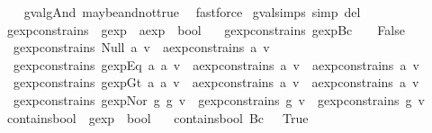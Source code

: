 \begin{isabellebody}
%
\isadelimproof
\ \ %
\endisadelimproof
%
\isatagproof
{}\isamarkupfalse%
\ gval{\isacharunderscore}gAnd\ maybe{\isacharunderscore}and{\isacharunderscore}not{\isacharunderscore}true\ \isamarkupfalse%
\ fastforce%
\endisatagproof
{\isafoldproof}%
%
\isadelimproof
\isanewline
%
\endisadelimproof
\isanewline
{}\isamarkupfalse%
\ gval{\isachardot}simps\ {\isacharbrackleft}simp\ del{\isacharbrackright}\isanewline
\isanewline
{}\isamarkupfalse%
\ gexp{\isacharunderscore}constrains\ {\isacharcolon}{\isacharcolon}\ {\isachardoublequoteopen}gexp\ {\isasymRightarrow}\ aexp\ {\isasymRightarrow}\ bool{\isachardoublequoteclose}\ \isanewline
\ \ {\isachardoublequoteopen}gexp{\isacharunderscore}constrains\ {\isacharparenleft}gexp{\isachardot}Bc\ {\isacharunderscore}{\isacharparenright}\ {\isacharunderscore}\ {\isacharequal}\ False{\isachardoublequoteclose}\ {\isacharbar}\isanewline
\ \ {\isachardoublequoteopen}gexp{\isacharunderscore}constrains\ {\isacharparenleft}Null\ a{\isacharparenright}\ v\ {\isacharequal}\ aexp{\isacharunderscore}constrains\ a\ v{\isachardoublequoteclose}\ {\isacharbar}\isanewline
\ \ {\isachardoublequoteopen}gexp{\isacharunderscore}constrains\ {\isacharparenleft}gexp{\isachardot}Eq\ a{}\ a{}{\isacharparenright}\ v\ {\isacharequal}\ {\isacharparenleft}aexp{\isacharunderscore}constrains\ a{}\ v\ {\isasymor}\ aexp{\isacharunderscore}constrains\ a{}\ v{\isacharparenright}{\isachardoublequoteclose}\ {\isacharbar}\isanewline
\ \ {\isachardoublequoteopen}gexp{\isacharunderscore}constrains\ {\isacharparenleft}gexp{\isachardot}Gt\ a{}\ a{}{\isacharparenright}\ v\ {\isacharequal}\ {\isacharparenleft}aexp{\isacharunderscore}constrains\ a{}\ v\ {\isasymor}\ aexp{\isacharunderscore}constrains\ a{}\ v{\isacharparenright}{\isachardoublequoteclose}\ {\isacharbar}\isanewline
\ \ {\isachardoublequoteopen}gexp{\isacharunderscore}constrains\ {\isacharparenleft}gexp{\isachardot}Nor\ g{}\ g{}{\isacharparenright}\ v\ {\isacharequal}\ {\isacharparenleft}gexp{\isacharunderscore}constrains\ g{}\ v\ {\isasymor}\ gexp{\isacharunderscore}constrains\ g{}\ v{\isacharparenright}{\isachardoublequoteclose}\isanewline
\isanewline
{}\isamarkupfalse%
\ contains{\isacharunderscore}bool\ {\isacharcolon}{\isacharcolon}\ {\isachardoublequoteopen}gexp\ {\isasymRightarrow}\ bool{\isachardoublequoteclose}\ \isanewline
\ \ {\isachardoublequoteopen}contains{\isacharunderscore}bool\ {\isacharparenleft}Bc\ {\isacharunderscore}{\isacharparenright}\ {\isacharequal}\ True{\isachardoublequoteclose}\ {\isacharbar}\isanewline

\end{isabellebody}
